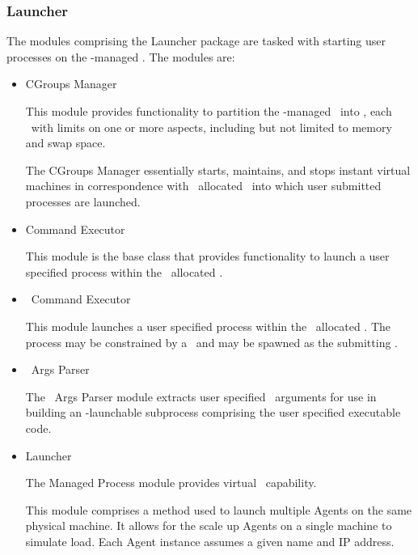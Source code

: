     \subsubsection{Launcher}   
          
    The modules comprising the Launcher package are tasked with
    starting user processes on the \varAgent-managed \varNodeMachineComputer.
    The modules are:
            
    \begin{itemize}
      \item CGroups Manager
      
      This module provides functionality to partition the \varAgent-managed
      \varNodeMachineComputer~into \varShares, each \varShare~with limits on one
      or more aspects, including but not limited to memory and swap space. 
      
      The CGroups Manager essentially starts, maintains, and stops instant
      virtual machines in correspondence with \varResourceManager~allocated
      \varShares~into which user submitted processes are launched.
      
      \item Command Executor
      
      This module is the base class that provides functionality to
      launch a user specified process within the 
      \varResourceManager~allocated \varShare. 
      
      \item \varDUCC~Command Executor
      
      This module launches a user specified process within the 
      \varResourceManager~allocated \varShare. 
      The process may be constrained by a \varLinuxControlGroup~and
      may be spawned as the submitting \varUser.
      
      \item \varJVM~Args Parser
      
      The \varJVM~Args Parser module extracts user specified \varJVM~arguments
      for use in building an \varAgent-launchable subprocess comprising
      the user specified executable code.
      
      \item Launcher
      
      The Managed Process module provides virtual \varAgent~capability.
      
      This module comprises a method used to launch multiple Agents
      on the same physical machine. 
      It allows for the scale up Agents on a single machine to simulate load.
      Each Agent instance assumes a given name and IP address.
      

\end{itemize}
